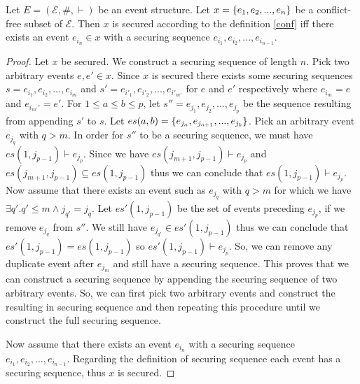 \begin{theorem}
    Let $E = (\mathcal{E}, \#, \vdash)$ be an event structure.
    Let $x = \{e_1,e_2,...,e_n\}$ be a conflict-free subset of $\mathcal{E}$.
    Then $x$ is secured according to the definition \ref{conf} iff
    there exists an event $e_{i_n} \in x$ with a securing sequence $e_{i_1},e_{i_2},...,e_{i_{n-1}}$.
\end{theorem}
\begin{proof}
    Let $x$ be secured.
    We construct a securing sequence of length $n$.
    Pick two arbitrary events $e, e' \in x$.
    Since $x$ is secured there exists some securing sequences
    $s = e_{i_1},e_{i_2},...,e_{i_m}$
    and $s' = e_{i'_1},e_{i'_2},...,e_{i'_{m'}}$
    for $e$ and $e'$ respectively where $e_{i_m} = e$
    and $e_{i_{m'}'} = e'$.
    For $1 \leq a \leq b \leq p$,
    let $s'' = e_{j_1},e_{j_2},...,e_{j_p}$
    be the sequence resulting from appending $s'$ to $s$.
    Let $es(a,b) = \{e_{j_a},e_{j_{a+1}},...,e_{j_{b}}\}$.
    Pick an arbitrary event $e_{j_q}$ with $q > m$.
    In order for $s''$ to be a securing sequence, we must have
    $es(1,j_{p-1}) \vdash e_{j_p}$.
    Since we have $es(j_{m+1},j_{p-1}) \vdash e_{j_p}$ and
    $es(j_{m+1},j_{p-1}) \subseteq es(1,j_{p-1})$ thus we can conclude
    that $es(1,j_{p-1}) \vdash e_{j_p}$.
    Now assume that there exists an event such as $e_{j_q}$ with $q > m$ for which we have $\exists q'. q' \leq m \wedge j_{q'} = j_q$.
    Let $es'(1,j_{p-1})$ be the set of events preceding $e_{j_p}$, if we remove $e_{j_q}$ from $s''$.
    We still have $e_{j_{q'}} \in es'(1,j_{p-1})$ thus we can conclude that $es'(1,j_{p-1}) = es(1,j_{p-1})$ so $es'(1,j_{p-1}) \vdash e_{j_{p}}$.
    So, we can remove any duplicate event after $e_{j_m}$ and still
    have a securing sequence.
    This proves that we can construct a securing sequence by
    appending the securing sequence of two arbitrary events.
    So, we can first pick two arbitrary events and construct the
    resulting in securing sequence and then repeating this procedure until
    we construct the full securing sequence.

    Now assume that there exists an event $e_{i_n}$ with a securing
    sequence $e_{i_1},e_{i_2},...,e_{i_{n-1}}$.
    Regarding the definition of securing sequence each event has a
    securing sequence, thus $x$ is secured.
\end{proof}

